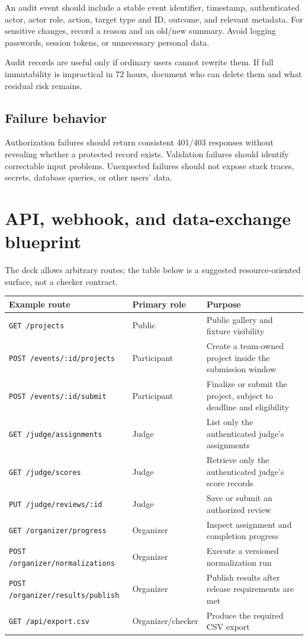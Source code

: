 An audit event should include a stable event identifier, timestamp, authenticated actor, actor role, action, target type and ID, outcome, and relevant metadata. For sensitive changes, record a reason and an old/new summary. Avoid logging passwords, session tokens, or unnecessary personal data.

Audit records are useful only if ordinary users cannot rewrite them. If full immutability is impractical in 72 hours, document who can delete them and what residual risk remains.

\subsection{Failure behavior}

Authorization failures should return consistent 401/403 responses without revealing whether a protected record exists. Validation failures should identify correctable input problems. Unexpected failures should not expose stack traces, secrets, database queries, or other users' data.

\section{API, webhook, and data-exchange blueprint}

\advisory\par


The deck allows arbitrary routes; the table below is a suggested resource-oriented surface, not a checker contract.

\begin{longtable}{@{}L{54mm}L{31mm}L{73mm}@{}}
\toprule
\textbf{Example route} & \textbf{Primary role} & \textbf{Purpose}\\
\midrule
\endhead%
\texttt{GET /projects} & Public & Public gallery and fixture visibility\\
\texttt{POST /events/:id/projects} & Participant & Create a team-owned project inside the submission window\\
\texttt{POST /events/:id/submit} & Participant & Finalize or submit the project, subject to deadline and eligibility\\
\texttt{GET /judge/assignments} & Judge & List only the authenticated judge's assignments\\
\texttt{GET /judge/scores} & Judge & Retrieve only the authenticated judge's score records\\
\texttt{PUT /judge/reviews/:id} & Judge & Save or submit an authorized review\\
\texttt{GET /organizer/progress} & Organizer & Inspect assignment and completion progress\\
\texttt{POST /organizer/normalizations} & Organizer & Execute a versioned normalization run\\
\texttt{POST /organizer/results/publish} & Organizer & Publish results after release requirements are met\\
\texttt{GET /api/export.csv} & Organizer/checker & Produce the required CSV export\\
\bottomrule
\end{longtable}

